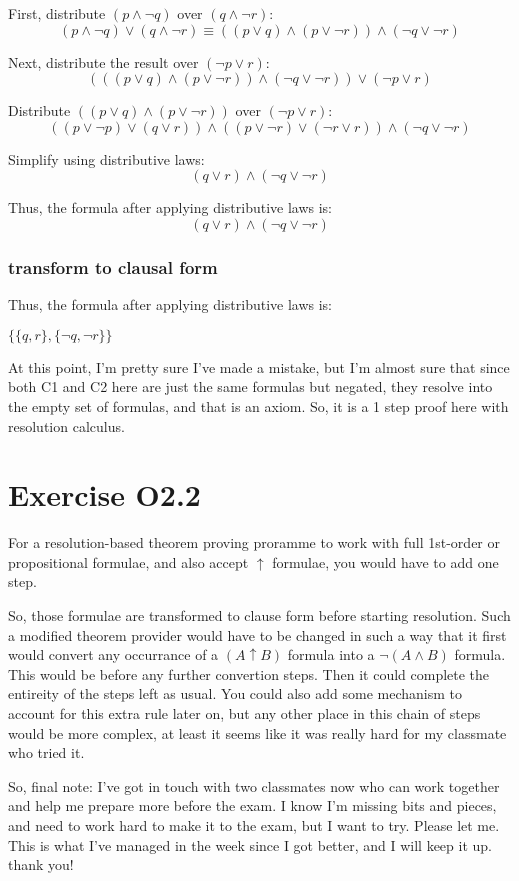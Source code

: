 \documentclass{article}
\begin{document}
First, distribute \((p \land \neg q)\) over \((q \land \neg r)\):
\[
(p \land \neg q) \lor (q \land \neg r) \equiv ((p \lor q) \land (p \lor \neg r)) \land (\neg q \lor \neg r)
\]

Next, distribute the result over \((\neg p \lor r)\):
\[
(((p \lor q) \land (p \lor \neg r)) \land (\neg q \lor \neg r)) \lor (\neg p \lor r)
\]

Distribute \(((p \lor q) \land (p \lor \neg r))\) over \((\neg p \lor r)\):
\[
((p \lor \neg p) \lor (q \lor r)) \land ((p \lor \neg r) \lor (\neg r \lor r)) \land (\neg q \lor \neg r)
\]

Simplify using distributive laws:
\[
(q \lor r) \land (\neg q \lor \neg r)
\]

Thus, the formula after applying distributive laws is:
\[
(q \lor r) \land (\neg q \lor \neg r)
\]


\subsubsection*{transform to clausal form}

Thus, the formula after applying distributive laws is:

$\{\{q , r\} , \{ \neg q, \neg r\}\}$



At this point, I'm pretty sure I've made a mistake, but I'm almost sure that since both C1 and C2 here are just the same formulas but negated, they resolve into the empty set of formulas, and that is an axiom. So, it is a 1 step proof here with resolution calculus.


\section*{Exercise O2.2}
For a resolution-based theorem proving proramme to work with full 1st-order or propositional formulae, and also accept $\uparrow$ formulae, you would have to add one step.

So, those formulae are transformed to clause form before starting resolution. Such a modified theorem provider would have to be changed in such a way that it first would convert any occurrance of a $ (A \uparrow B) $ formula into a  $\neg (A \land B) $ formula. This would be before any further convertion steps. Then it could complete the entireity of the steps left as usual.
You could also add some mechanism to account for this extra rule later on, but any other place in this chain of steps would be more complex, at least it seems like it was really hard for my classmate who tried it.


So, final note: I've got in touch with two classmates now who can work together and help me prepare more before the exam. I know I'm missing bits and pieces, and need to work hard to make it to the exam, but I want to try. Please let me. This is what I've managed in the week since I got better, and I will keep it up. thank you!
\end{document}
